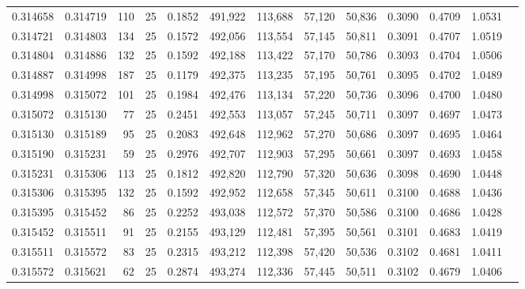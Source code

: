 \begin{tabular}{rrrrrrrrrrrrr}
0.314658 & 0.314719 &   110 &  25 &                                     0.1852 & 491,922 & 113,688 &  57,120 &  50,836 & 0.3090 & 0.4709 & 1.0531 \\
0.314721 & 0.314803 &   134 &  25 &                                     0.1572 & 492,056 & 113,554 &  57,145 &  50,811 & 0.3091 & 0.4707 & 1.0519 \\
0.314804 & 0.314886 &   132 &  25 &                                     0.1592 & 492,188 & 113,422 &  57,170 &  50,786 & 0.3093 & 0.4704 & 1.0506 \\
0.314887 & 0.314998 &   187 &  25 &                                     0.1179 & 492,375 & 113,235 &  57,195 &  50,761 & 0.3095 & 0.4702 & 1.0489 \\
0.314998 & 0.315072 &   101 &  25 &                                     0.1984 & 492,476 & 113,134 &  57,220 &  50,736 & 0.3096 & 0.4700 & 1.0480 \\
0.315072 & 0.315130 &    77 &  25 &                                     0.2451 & 492,553 & 113,057 &  57,245 &  50,711 & 0.3097 & 0.4697 & 1.0473 \\
0.315130 & 0.315189 &    95 &  25 &                                     0.2083 & 492,648 & 112,962 &  57,270 &  50,686 & 0.3097 & 0.4695 & 1.0464 \\
0.315190 & 0.315231 &    59 &  25 &                                     0.2976 & 492,707 & 112,903 &  57,295 &  50,661 & 0.3097 & 0.4693 & 1.0458 \\
0.315231 & 0.315306 &   113 &  25 &                                     0.1812 & 492,820 & 112,790 &  57,320 &  50,636 & 0.3098 & 0.4690 & 1.0448 \\
0.315306 & 0.315395 &   132 &  25 &                                     0.1592 & 492,952 & 112,658 &  57,345 &  50,611 & 0.3100 & 0.4688 & 1.0436 \\
0.315395 & 0.315452 &    86 &  25 &                                     0.2252 & 493,038 & 112,572 &  57,370 &  50,586 & 0.3100 & 0.4686 & 1.0428 \\
0.315452 & 0.315511 &    91 &  25 &                                     0.2155 & 493,129 & 112,481 &  57,395 &  50,561 & 0.3101 & 0.4683 & 1.0419 \\
0.315511 & 0.315572 &    83 &  25 &                                     0.2315 & 493,212 & 112,398 &  57,420 &  50,536 & 0.3102 & 0.4681 & 1.0411 \\
0.315572 & 0.315621 &    62 &  25 &                                     0.2874 & 493,274 & 112,336 &  57,445 &  50,511 & 0.3102 & 0.4679 & 1.0406 \\

\end{tabular}
